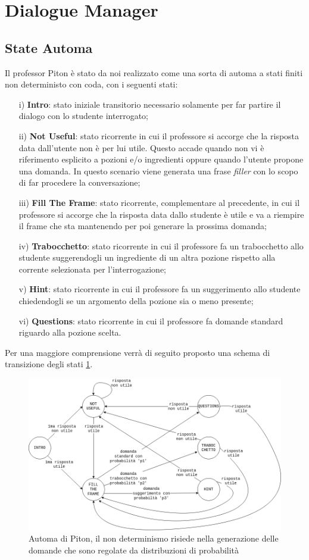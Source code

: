\section{Dialogue Manager}
\label{sec:3}
\subsection{State Automa}
Il professor Piton è stato da noi realizzato come una sorta di automa a stati finiti non deterministo con coda, con i seguenti stati:
\begin{itemize}
    \item[i)]\textbf{Intro}: stato iniziale transitorio necessario solamente per far partire il dialogo con lo studente interrogato;
    \item[ii)]\textbf{Not Useful}: stato ricorrente in cui il professore si accorge che la risposta data dall'utente non è per lui utile. Questo accade quando non vi è riferimento esplicito a pozioni e/o ingredienti oppure quando l'utente propone una domanda. In questo scenario viene generata una frase \textit{filler} con lo scopo di far procedere la conversazione;
    \item[iii)]\textbf{Fill The Frame}: stato ricorrente, complementare al precedente, in cui il professore si accorge che la risposta data dallo studente è utile e va a riempire il frame che sta mantenendo per poi generare la prossima domanda;
    \item[iv)]\textbf{Trabocchetto}: stato ricorrente in cui il professore fa un trabocchetto allo studente suggerendogli un ingrediente di un altra pozione rispetto alla corrente selezionata per l'interrogazione;
    \item[v)]\textbf{Hint}: stato ricorrente in cui il professore fa un suggerimento allo studente chiedendogli se un argomento della pozione sia o meno presente;
    \item[vi)]\textbf{Questions}: stato ricorrente in cui il professore fa domande standard riguardo alla pozione scelta.
\end{itemize}
Per una maggiore comprensione verrà di seguito proposto una schema di transizione degli stati \ref{fig:Automa}.
\begin{figure}[h]
\centerline{\includegraphics[scale=0.4]{Images/stateTransition.png}}
\caption{Automa di Piton, il non determinismo risiede nella generazione delle domande che sono regolate da distribuzioni di probabilità}
\label{fig:Automa}
\end{figure}

